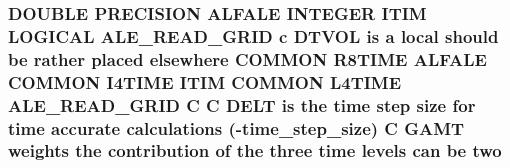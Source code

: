 \hypertarget{msa20_2home_2abonfi_2_c_f_d__codes_2_eul_f_s_83_82_83_2include_2time_8com_af6fa394ac00f173f45ace38681d2e1a4}{
\subsubsection[{two}]{\setlength{\rightskip}{0pt plus 5cm}D\-O\-U\-B\-L\-E P\-R\-E\-C\-I\-S\-I\-O\-N {\bf A\-L\-F\-A\-L\-E} I\-N\-T\-E\-G\-E\-R {\bf I\-T\-I\-M} L\-O\-G\-I\-C\-A\-L {\bf A\-L\-E\-\_\-\-R\-E\-A\-D\-\_\-\-G\-R\-I\-D} c {\bf D\-T\-V\-O\-L} is a local should be rather placed elsewhere C\-O\-M\-M\-O\-N R8\-T\-I\-M\-E {\bf A\-L\-F\-A\-L\-E} C\-O\-M\-M\-O\-N I4\-T\-I\-M\-E {\bf I\-T\-I\-M} C\-O\-M\-M\-O\-N L4\-T\-I\-M\-E {\bf A\-L\-E\-\_\-\-R\-E\-A\-D\-\_\-\-G\-R\-I\-D} C C {\bf D\-E\-L\-T} is the time {\bf step} size for time accurate calculations (-\/time\-\_\-step\-\_\-size) C {\bf G\-A\-M\-T} weights the contribution of the three time levels can be two}}\label{msa20_2home_2abonfi_2_c_f_d__codes_2_eul_f_s_83_82_83_2include_2time_8com_af6fa394ac00f173f45ace38681d2e1a4}
